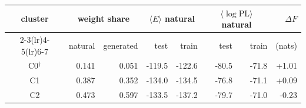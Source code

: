 \begin{tabular}{crrrrrrr}
\toprule
cluster & \multicolumn{2}{c}{weight share} & \multicolumn{2}{c}{$\langle E\rangle$ natural} & \multicolumn{2}{c}{$\langle\log\mathrm{PL}\rangle$ natural} & $\Delta F$ \\
\cmidrule(lr){2-3}\cmidrule(lr){4-5}\cmidrule(lr){6-7}
 & natural & generated & test & train & test & train & (nats) \\
\midrule
C0$^{\dagger}$ & 0.141 & 0.051 & -119.5 & -122.6 & -80.5 & -71.8 & +1.01 \\
C1 & 0.387 & 0.352 & -134.0 & -134.5 & -76.8 & -71.1 & +0.09 \\
C2 & 0.473 & 0.597 & -133.5 & -137.2 & -79.7 & -71.0 & -0.23 \\
\bottomrule
\end{tabular}